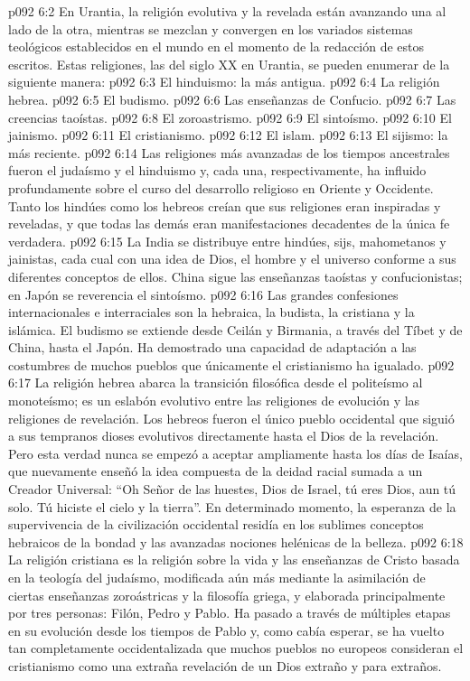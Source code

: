 \vs p092 6:2 \pc En Urantia, la religión evolutiva y la revelada están avanzando una al lado de la otra, mientras se mezclan y convergen en los variados sistemas teológicos establecidos en el mundo en el momento de la redacción de estos escritos. Estas religiones, las del siglo XX en Urantia, se pueden enumerar de la siguiente manera:
\vs p092 6:3 El hinduismo: la más antigua.
\vs p092 6:4 La religión hebrea.
\vs p092 6:5 El budismo.
\vs p092 6:6 Las enseñanzas de Confucio.
\vs p092 6:7 Las creencias taoístas.
\vs p092 6:8 El zoroastrismo.
\vs p092 6:9 El sintoísmo.
\vs p092 6:10 El jainismo.
\vs p092 6:11 El cristianismo.
\vs p092 6:12 El islam.
\vs p092 6:13 El sijismo: la más reciente.
\vs p092 6:14 \pc Las religiones más avanzadas de los tiempos ancestrales fueron el judaísmo y el hinduismo y, cada una, respectivamente, ha influido profundamente sobre el curso del desarrollo religioso en Oriente y Occidente. Tanto los hindúes como los hebreos creían que sus religiones eran inspiradas y reveladas, y que todas las demás eran manifestaciones decadentes de la única fe verdadera.
\vs p092 6:15 La India se distribuye entre hindúes, sijs, mahometanos y jainistas, cada cual con una idea de Dios, el hombre y el universo conforme a sus diferentes conceptos de ellos. China sigue las enseñanzas taoístas y confucionistas; en Japón se reverencia el sintoísmo.
\vs p092 6:16 Las grandes confesiones internacionales e interraciales son la hebraica, la budista, la cristiana y la islámica. El budismo se extiende desde Ceilán y Birmania, a través del Tíbet y de China, hasta el Japón. Ha demostrado una capacidad de adaptación a las costumbres de muchos pueblos que únicamente el cristianismo ha igualado.
\vs p092 6:17 La religión hebrea abarca la transición filosófica desde el politeísmo al monoteísmo; es un eslabón evolutivo entre las religiones de evolución y las religiones de revelación. Los hebreos fueron el único pueblo occidental que siguió a sus tempranos dioses evolutivos directamente hasta el Dios de la revelación. Pero esta verdad nunca se empezó a aceptar ampliamente hasta los días de Isaías, que nuevamente enseñó la idea compuesta de la deidad racial sumada a un Creador Universal: “Oh Señor de las huestes, Dios de Israel, tú eres Dios, aun tú solo. Tú hiciste el cielo y la tierra”. En determinado momento, la esperanza de la supervivencia de la civilización occidental residía en los sublimes conceptos hebraicos de la bondad y las avanzadas nociones helénicas de la belleza.
\vs p092 6:18 La religión cristiana es la religión sobre la vida y las enseñanzas de Cristo basada en la teología del judaísmo, modificada aún más mediante la asimilación de ciertas enseñanzas zoroástricas y la filosofía griega, y elaborada principalmente por tres personas: Filón, Pedro y Pablo. Ha pasado a través de múltiples etapas en su evolución desde los tiempos de Pablo y, como cabía esperar, se ha vuelto tan completamente occidentalizada que muchos pueblos no europeos consideran el cristianismo como una extraña revelación de un Dios extraño y para extraños.
